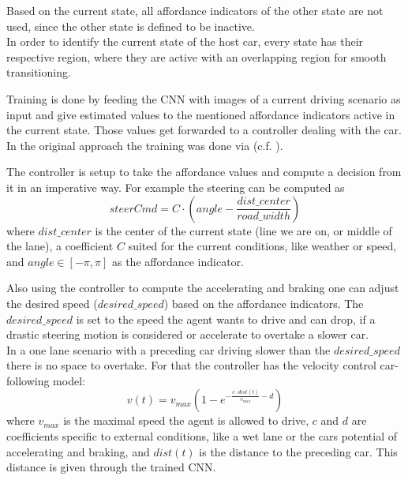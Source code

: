 Based on the current state, all affordance indicators of the other state are not used, since the other state is defined to be inactive.\\
In order to identify the current state of the host car, every state has their respective region, where they are active with an overlapping region for smooth transitioning.

Training is done by feeding the CNN with images of a current driving scenario as input and give estimated values to the mentioned affordance indicators active in the current state. Those values get forwarded to a controller dealing with the car. In the original approach the training was done via \torcs (c.f. ).

The controller is setup to take the affordance values and compute a decision from it in an imperative way. For example the steering can be computed as 
	$$ steerCmd = C \cdot (angle-\frac{dist\_center}{road\_width})$$
where $dist\_center$ is the center of the current state (line we are on, or middle of the lane), a coefficient $C$ suited for the current conditions, like weather or speed, and $angle\in [-\pi, \pi]$ as the affordance indicator.

Also using the controller to compute the accelerating and braking one can adjust the desired speed ($desired\_speed$) based on the affordance indicators. The $desired\_speed$ is set to the speed the agent wants to drive and can drop, if a drastic steering motion is considered or accelerate to overtake a slower car.\\
In a one lane scenario with a  preceding car driving slower than the $desired\_speed$ there is no space to overtake. For that the controller has the velocity control car-following model:
	$$ v(t) = v_{max}(1-e^{-\frac{c\cdot dist(t)}{v_{max}} -d})$$ 
where $v_{max}$ is the maximal speed the agent is allowed to drive, $c$ and $d$ are coefficients specific to external conditions, like a wet lane or the cars potential of accelerating and braking, and $dist(t)$ is the distance to the preceding car. This distance is given through the trained CNN.




